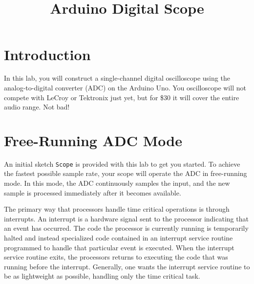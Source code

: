 \documentclass[12pt]{article}
\begin{document}
\title{Arduino Digital Scope} 

\maketitle

\section{Introduction}

In this lab, you will construct a single-channel digital oscilloscope using the analog-to-digital converter (ADC) on the Arduino Uno.  You oscilloscope will not compete with LeCroy or Tektronix just yet, but for \$30 it will cover the entire audio range.  Not bad!

\section{Free-Running ADC Mode}

An initial sketch {\tt Scope} is provided with this lab to get you started.  To achieve the fastest possible sample rate, your scope will operate the ADC in free-running mode.  In this mode, the ADC continuously samples the input, and the new sample is processed immediately after it becomes available.

The primary way that processors handle time critical operations is through interrupts.  An interrupt is a hardware signal sent to the processor indicating that an event has occurred.  The code the processor is currently running is temporarily halted and instead specialized code contained in an interrupt service routine programmed to handle that particular event is executed.   When the interrupt service routine exits, the processors returns to executing the code that was running before the interrupt.   Generally, one wants the interrupt service routine to be as lightweight as possible, handling only the time critical task.
\end{document}
